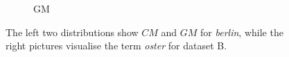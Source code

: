 \begin{figure}
\begin{subfigure}[b]{.23\textwidth}
		\caption{GM}
	\end{subfigure}
	\caption[Distributions for \emph{berlin}, \emph{oster} using dataset B.]{The left two distributions show $CM$ and $GM$ for \emph{berlin}, while the right pictures visualise the term \emph{oster} for dataset B.}
	\label{fig:B_comp}
\end{figure}